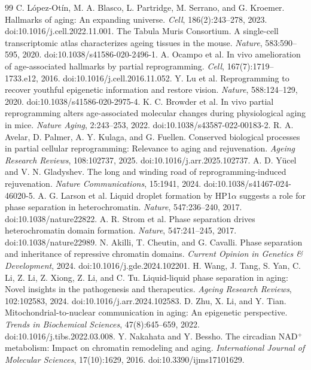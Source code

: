 \documentclass[11pt,a4paper]{article}
\theoremstyle{definition}
\theoremstyle{remark}
\begin{document}
\begin{thebibliography}{99}
 C. L\'opez-Ot\'in, M. A. Blasco, L. Partridge, M. Serrano, and G. Kroemer. Hallmarks of aging: An expanding universe. \emph{Cell}, 186(2):243--278, 2023. doi:10.1016/j.cell.2022.11.001.
 The Tabula Muris Consortium. A single-cell transcriptomic atlas characterizes ageing tissues in the mouse. \emph{Nature}, 583:590--595, 2020. doi:10.1038/s41586-020-2496-1.
 A. Ocampo et al. In vivo amelioration of age-associated hallmarks by partial reprogramming. \emph{Cell}, 167(7):1719--1733.e12, 2016. doi:10.1016/j.cell.2016.11.052.
 Y. Lu et al. Reprogramming to recover youthful epigenetic information and restore vision. \emph{Nature}, 588:124--129, 2020. doi:10.1038/s41586-020-2975-4.
 K. C. Browder et al. In vivo partial reprogramming alters age-associated molecular changes during physiological aging in mice. \emph{Nature Aging}, 2:243--253, 2022. doi:10.1038/s43587-022-00183-2.
 R. A. Avelar, D. Palmer, A. Y. Kulaga, and G. Fuellen. Conserved biological processes in partial cellular reprogramming: Relevance to aging and rejuvenation. \emph{Ageing Research Reviews}, 108:102737, 2025. doi:10.1016/j.arr.2025.102737.
 A. D. Y\"ucel and V. N. Gladyshev. The long and winding road of reprogramming-induced rejuvenation. \emph{Nature Communications}, 15:1941, 2024. doi:10.1038/s41467-024-46020-5.
 A. G. Larson et al. Liquid droplet formation by HP1$\alpha$ suggests a role for phase separation in heterochromatin. \emph{Nature}, 547:236--240, 2017. doi:10.1038/nature22822.
 A. R. Strom et al. Phase separation drives heterochromatin domain formation. \emph{Nature}, 547:241--245, 2017. doi:10.1038/nature22989.
 N. Akilli, T. Cheutin, and G. Cavalli. Phase separation and inheritance of repressive chromatin domains. \emph{Current Opinion in Genetics \& Development}, 2024. doi:10.1016/j.gde.2024.102201.
 H. Wang, J. Tang, S. Yan, C. Li, Z. Li, Z. Xiong, Z. Li, and C. Tu. Liquid-liquid phase separation in aging: Novel insights in the pathogenesis and therapeutics. \emph{Ageing Research Reviews}, 102:102583, 2024. doi:10.1016/j.arr.2024.102583.
 D. Zhu, X. Li, and Y. Tian. Mitochondrial-to-nuclear communication in aging: An epigenetic perspective. \emph{Trends in Biochemical Sciences}, 47(8):645--659, 2022. doi:10.1016/j.tibs.2022.03.008.
 Y. Nakahata and Y. Bessho. The circadian NAD$^+$ metabolism: Impact on chromatin remodeling and aging. \emph{International Journal of Molecular Sciences}, 17(10):1629, 2016. doi:10.3390/ijms17101629.

\end{thebibliography}
\end{document}
